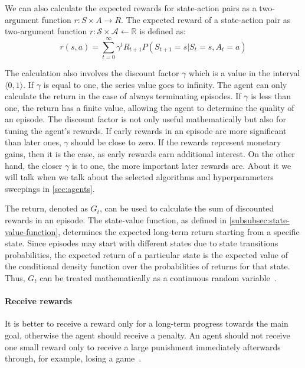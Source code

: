 \documentclass[../xlapes02]{subfiles}
\begin{document}
    We can also calculate the expected rewards for state-action pairs as a two-argument function $r: S \times A \to R$.
    The expected reward of a state-action pair as two-argument function $r: \mathcal{S}\times \mathcal{A}\leftarrow \mathbb{R}$ is defined as:
    \begin{equation}
        r(s, a) = \sum_{t=0}^{\infty} \gamma^t R_{t+1} P(S_{t+1} = s|S_t = s, A_t = a)
    \end{equation}

    The calculation also involves the discount factor $\gamma$ which is a value in the interval $\langle 0, 1 \rangle$.
    If $\gamma$ is equal to one, the series value goes to infinity.
    The agent can only calculate the return in the case of always terminating episodes.
    If $\gamma$ is less than one, the return has a finite value, allowing the agent to determine the quality of an episode.
    The discount factor is not only useful mathematically but also for tuning the agent's rewards.
    If early rewards in an episode are more significant than later ones, $\gamma$ should be close to zero.
    If the rewards represent monetary gains, then it is the case, as early rewards earn additional interest.
    On the other hand, the closer $\gamma$ is to one, the more important later rewards are.
    About it we will talk when we talk about the selected algorithms and hyperparameters sweepings in \cref{sec:agents}.

    The return, denoted as $G_t$, can be used to calculate the sum of discounted rewards in an episode.
    The state-value function, as defined in \cref{subsubsec:state-value-function}, determines the expected long-term return starting from a specific state.
    Since episodes may start with different states due to state transitions probabilities, the expected return of a particular state is the expected value of the conditional density function over the probabilities of returns for that state.
    Thus, $G_t$ can be treated mathematically as a continuous random variable~\cite{FITMT25127}.

    \paragraph{Receive rewards}
    It is better to receive a reward only for a long-term progress towards the main goal, otherwise the agent should receive a penalty.
    An agent should not receive one small reward only to receive a large punishment immediately afterwards through, for example, losing a game~\cite{sutton2018reinforcement}.
\end{document}
